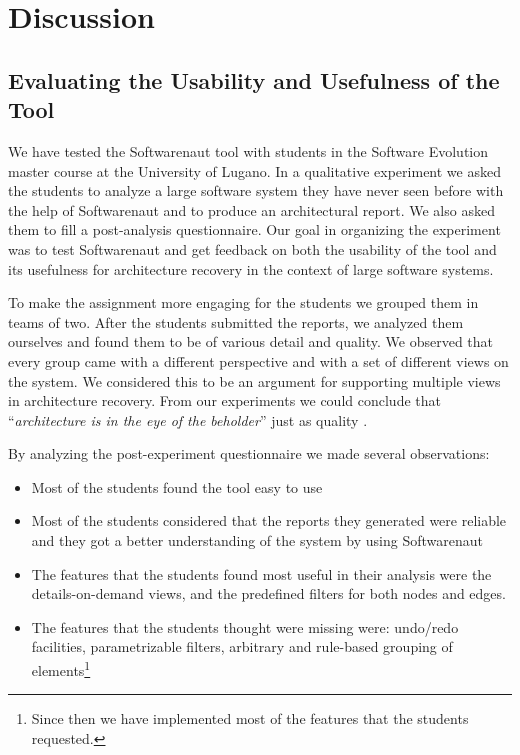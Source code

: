 \documentclass[preprint,12pt]{elsarticle}
\begin{document}



\newpage
\section {Discussion}
\label {sec:disc}

\subsection {Evaluating the Usability and Usefulness of the Tool}
We have tested the Softwarenaut tool with students in the Software Evolution master course at the University of Lugano. In a qualitative experiment we asked the students to analyze a large software system they have never seen before with the help of Softwarenaut and to produce an architectural report. We also asked them to fill a post-analysis questionnaire. Our goal in organizing the experiment was to test Softwarenaut and get feedback on both the usability of the tool and its usefulness for architecture recovery in the context of large software systems. 

To make the assignment more engaging for the students we grouped them in teams of two. After the students submitted the reports, we analyzed them ourselves and found them to be of various detail and quality. We observed that every group came with a different perspective and with a set of different views on the system. We considered this to be an argument for supporting multiple views in architecture recovery. From our experiments we could conclude that ``{\em architecture is in the eye of the beholder}'' just as quality \cite{bass-architecture}.

By analyzing the post-experiment questionnaire we made several observations:

\begin{itemize}
\item Most of the students found the tool easy to use 
\item Most of the students considered that the reports they generated were reliable and they got a better understanding of the system by using Softwarenaut
\item The features that the students found most useful in their analysis were the details-on-demand views, and the predefined filters for both nodes and edges.
\item The features that the students thought were missing were: undo/redo facilities, parametrizable filters, arbitrary and rule-based grouping of elements\footnote{Since then we have implemented most of the features that the students requested.}
\end{itemize}
\end{document}
